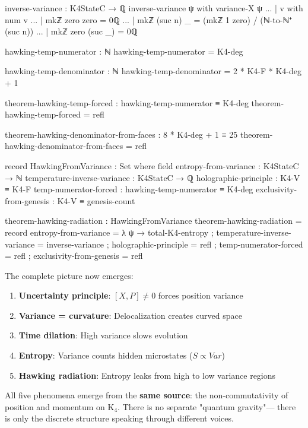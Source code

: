 \documentclass[11pt,a4paper]{book}
\def\text#1{#1}%
\begin{document}
\begin{code}
inverse-variance : K4StateC → ℚ
inverse-variance ψ with variance-X ψ
... | v with num v
...   | mkℤ zero zero = 0ℚ
...   | mkℤ (suc n) _ = (mkℤ 1 zero) / (ℕ-to-ℕ⁺ (suc n))
...   | mkℤ zero (suc _) = 0ℚ

hawking-temp-numerator : ℕ
hawking-temp-numerator = K4-deg

hawking-temp-denominator : ℕ
hawking-temp-denominator = 2 * K4-F * K4-deg + 1

theorem-hawking-temp-forced : hawking-temp-numerator ≡ K4-deg
theorem-hawking-temp-forced = refl

theorem-hawking-denominator-from-faces : 8 * K4-deg + 1 ≡ 25
theorem-hawking-denominator-from-faces = refl

record HawkingFromVariance : Set where
  field
    entropy-from-variance : K4StateC → ℕ
    temperature-inverse-variance : K4StateC → ℚ
    holographic-principle : K4-V ≡ K4-F
    temp-numerator-forced : hawking-temp-numerator ≡ K4-deg
    exclusivity-from-genesis : K4-V ≡ genesis-count

theorem-hawking-radiation : HawkingFromVariance
theorem-hawking-radiation = record
  { entropy-from-variance = λ ψ → total-K4-entropy
  ; temperature-inverse-variance = inverse-variance
  ; holographic-principle = refl
  ; temp-numerator-forced = refl
  ; exclusivity-from-genesis = refl
  }
\end{code}

The complete picture now emerges:

\begin{enumerate}
\item \textbf{Uncertainty principle}: $[X,P] \neq 0$ forces position variance
\item \textbf{Variance = curvature}: Delocalization creates curved space
\item \textbf{Time dilation}: High variance slows evolution
\item \textbf{Entropy}: Variance counts hidden microstates ($S \propto \text{Var}$)
\item \textbf{Hawking radiation}: Entropy leaks from high to low variance regions
\end{enumerate}

All five phenomena emerge from the \textbf{same source}: the non-commutativity
of position and momentum on K$_4$. There is no separate "quantum gravity"---
there is only the discrete structure speaking through different voices.

\end{document}
